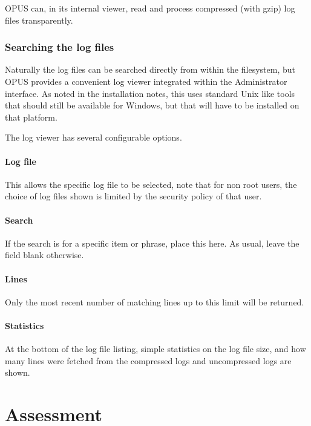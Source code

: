 \documentclass[12 pt]{book}
\begin{document}
OPUS can, in its internal viewer, read and process compressed (with gzip) log files transparently.


\subsection{Searching the log files}

Naturally the log files can be searched directly from within the filesystem, but OPUS provides a
convenient log viewer integrated within the Administrator interface. As noted in the installation notes,
this uses standard Unix like tools that should still be available for Windows, but that will have to
be installed on that platform.

The log viewer has several configurable options.

\subsubsection{Log file}

This allows the specific log file to be selected, note that for non root users, the choice of log files
shown is limited by the security policy of that user.

\subsubsection{Search}

If the search is for a specific item or phrase, place this here. As usual, leave the field blank otherwise.

\subsubsection{Lines}

Only the most recent number of matching lines up to this limit will be returned.

\subsubsection{Statistics}

At the bottom of the log file listing, simple statistics on the log file size, and how many lines were fetched from the compressed logs and uncompressed logs are shown.


%
%
%

\chapter{Assessment}
\end{document}
